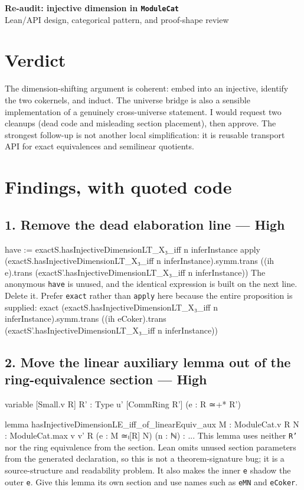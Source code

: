 \documentclass[10pt]{article}
\newenvironment{lean}{\Verbatim[fontsize=\scriptsize,frame=single,framesep=2mm,formatcom=\leanfont]}{\endVerbatim}
\newcommand{\high}{\textcolor{priority}{\textbf{High}}}
\begin{document}
\begin{center}
{\Large\bfseries Re-audit: injective dimension in \texttt{ModuleCat}}\\[-1mm]
\small Lean/API design, categorical pattern, and proof-shape review
\end{center}
\small
\section*{Verdict}
The dimension-shifting argument is coherent: embed into an injective, identify the two cokernels,
and induct. The universe bridge is also a sensible implementation of a genuinely cross-universe
statement. I would request two cleanups (dead code and misleading section placement), then approve.
The strongest follow-up is not another local simplification: it is reusable transport API for exact
equivalences and semilinear quotients.

\section*{Findings, with quoted code}

\subsection*{1. Remove the dead elaboration line --- \high}
\begin{lean}
have := exactS.hasInjectiveDimensionLT_X₃_iff n inferInstance
apply (exactS.hasInjectiveDimensionLT_X₃_iff n inferInstance).symm.trans
  ((ih e).trans (exactS'.hasInjectiveDimensionLT_X₃_iff n inferInstance))
\end{lean}
The anonymous \texttt{have} is unused, and the identical expression is
built on the next line. Delete it. Prefer \texttt{exact} rather than \texttt{apply} here because the
entire proposition is supplied:
\begin{lean}
exact (exactS.hasInjectiveDimensionLT_X₃_iff n inferInstance).symm.trans
  ((ih eCoker).trans
    (exactS'.hasInjectiveDimensionLT_X₃_iff n inferInstance))
\end{lean}

\subsection*{2. Move the linear auxiliary lemma out of the ring-equivalence section --- \high}
\begin{lean}
variable [Small.{v} R] {R' : Type u'} [CommRing R'] (e : R ≃+* R')

lemma hasInjectiveDimensionLE_iff_of_linearEquiv_aux
    {M : ModuleCat.{v} R} {N : ModuleCat.{max v v'} R}
    (e : M ≃ₗ[R] N) (n : ℕ) : ...
\end{lean}
This lemma uses neither \texttt{R'} nor the ring equivalence from the section. Lean omits unused
section parameters from the generated declaration, so this is not a theorem-signature bug; it is a
source-structure and readability problem. It also makes the inner \texttt{e} shadow the outer
\texttt{e}. Give this lemma its own section and use names such as \texttt{eMN} and \texttt{eCoker}.
\end{document}
